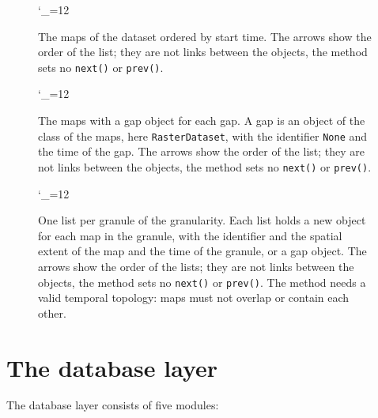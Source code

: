 \documentclass[10pt,a4paper]{article}
\makeatletter
\newcommand{\umlfigure}[1]{%
  \begingroup\catcode`\_=12 \ttfamily\endgroup}
\newcommand{\code}[1]{\texttt{#1}}
\newcommand{\attachmentdate}{D:20261106000000Z}
\DeclareRobustCommand{\examplefile}[1]{%
  \code{python/grass/docs/src/temporal\_framework\_design/examples/%
    \detokenize{#1}}\\
  attached to this PDF as \code{\detokenize{#1}}%
  \embedfileifobjectexists{\detokenize{#1}}{Filespec}{}{%
    \begingroup
    \def\pdf@filemoddate##1{\attachmentdate}%
    \embedfile[id=\detokenize{#1},filespec=\detokenize{#1},
      mimetype=text/x-python]{examples/\detokenize{#1}}%
    \endgroup}}
\makeatother
\begin{document}
\begin{figure}[ht]
\centering
\umlfigure{maps_as_objects}
\caption{The maps of the dataset ordered by start time. The arrows show the
order of the list; they are not links between the objects, the method sets no
\code{next()} or \code{prev()}.}
\label{fig:as-objects}
\end{figure}

\begin{figure}[ht]
\centering
\umlfigure{maps_with_gaps}
\caption{The maps with a gap object for each gap. A gap is an object of the
class of the maps, here \code{RasterDataset}, with the identifier
\code{None} and the time of the gap. The arrows show the order of the list;
they are not links between the objects, the method sets no \code{next()} or
\code{prev()}.}
\label{fig:with-gaps}
\end{figure}

\begin{figure}[ht]
\centering
\umlfigure{maps_by_granularity}
\caption{One list per granule of the granularity. Each list holds a new object
for each map in the granule, with the identifier and the spatial extent of the
map and the time of the granule, or a gap object. The arrows show the order of
the lists; they are not links between the objects, the method sets no
\code{next()} or \code{prev()}. The method needs a valid temporal topology:
maps must not overlap or contain each other.}
\label{fig:by-granularity}
\end{figure}

\FloatBarrier





\section{The database layer}
\label{sec:database}

The database layer consists of five modules:
\end{document}
